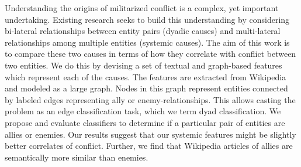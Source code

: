 Understanding the origins of militarized conflict is a complex, yet important undertaking. Existing research seeks to build this understanding by considering bi-lateral relationships between entity pairs (dyadic causes) and multi-lateral relationships among multiple entities (systemic causes). The aim of this work is to compare these two causes in terms of how they correlate with conflict between two entities. We do this by devising a set of textual and graph-based features which represent each of the causes. The features are extracted from Wikipedia and modeled as a large graph. Nodes in this graph represent entities connected by labeled edges representing ally or enemy-relationships. This allows casting the problem as an edge classification task, which we term dyad classification. We propose and evaluate classifiers to determine if a particular pair of entities are allies or enemies. Our results suggest that our systemic features might be slightly better correlates of conflict. Further, we find that Wikipedia articles of allies are semantically more similar than enemies.
